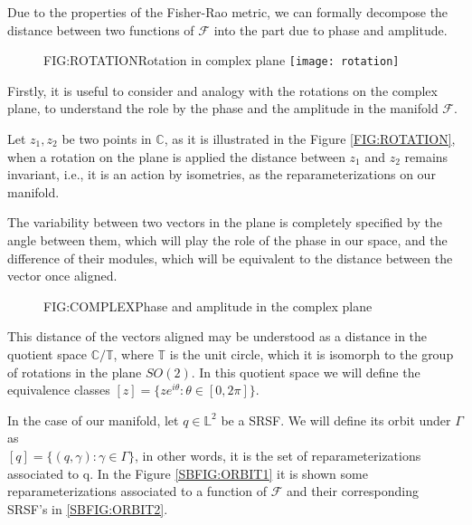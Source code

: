 
Due to the properties of the Fisher-Rao metric, we can formally decompose the distance
between two functions of $\mathcal{F}$ into the part due to phase and amplitude.

\begin{figure}[Rotation in complex plane]{FIG:ROTATION}{Rotation in complex plane}
	\texttt{[image: rotation]}
\end{figure}

Firstly, it is useful to consider and analogy with the rotations on the complex
plane, to understand the role by the phase and the amplitude in the manifold
$\mathcal{F}$.

Let $z_1, z_2$ be two points in $\mathbb{C}$, as it is illustrated in the
Figure \ref{FIG:ROTATION}, when a rotation on the plane is applied the distance
between $z_1$ and $z_2$ remains invariant, i.e., it is an action by isometries, as the
reparameterizations on our manifold.

The variability between two vectors in the plane is completely specified by
the angle between them, which will play the role of the phase in our space, and
the difference of their modules, which will be equivalent to the distance
between the vector once aligned.

\begin{figure}[Phase and amplitude in the complex plane]{FIG:COMPLEX}{Phase and amplitude in the complex plane}

 \qquad
{}

\end{figure}


This distance of the vectors aligned may be understood as a distance in the
quotient space $\mathbb{C} / \mathbb{T}$, where $\mathbb{T}$ is the unit circle,
which it is isomorph to the group of rotations in the plane $SO(2)$. In this
quotient space we will define the equivalence classes
$[z] = \{z e^{i \theta} : \theta \in [0, 2\pi]\}$.

In the case of our manifold, let $q \in \mathbb{L}^2$ be a  \acs{SRSF}. We will define
its orbit under $\Gamma$ as \\$[q] = \{(q, \gamma) : \gamma \in \Gamma \}$, in
other words, it is the set of reparameterizations associated to q. In the
Figure \ref{SBFIG:ORBIT1} it is shown some reparameterizations associated  to a function
of $\mathscr{F}$ and their corresponding SRSF's in \ref{SBFIG:ORBIT2}.


